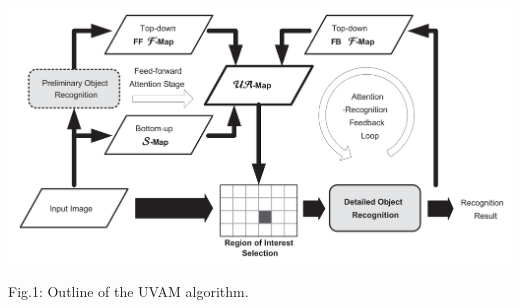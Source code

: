 \begin{center}
	\includegraphics[scale=0.65]{alg.png}
	\caption{Fig.1: Outline of the UVAM algorithm.}
	\label{fig:1}
\end{center}



